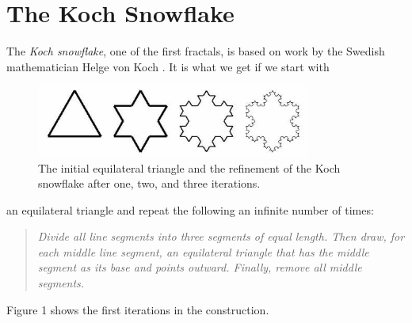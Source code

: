 \documentclass[12pt, a4paper]{article}
\begin{document}
%
\section{The Koch Snowflake}
The \emph{Koch snowflake}, one of the first fractals, is based on work by the
Swedish mathematician Helge von Koch \cite{aoeu}. It is what we get if we
start with
\begin{figure}[h]
	\label{kalas}
	\centering
	\includegraphics[width=9cm]{snowflake.jpg}
	\caption{The initial equilateral triangle and the refinement of the Koch
		snowflake after one, two, and three iterations.}
\end{figure}
an equilateral triangle and repeat the following an infinite number
of times:
\begin{quote}
\emph{Divide all line segments into three segments of equal length. Then draw,
	for each middle line segment, an equilateral triangle that has the middle
	segment as its base and points outward. Finally, remove all middle segments.
	}
\end{quote}
Figure 1 shows the first iterations in the construction.
%
%
\end{document}
